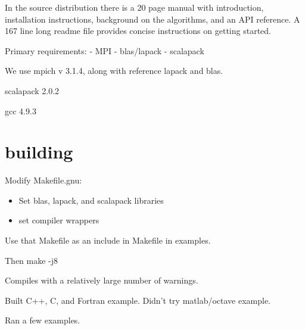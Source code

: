\documentclass{acmsmall}
\begin{document}
In the source distribution there is a 20 page manual with
introduction, installation instructions, background on the
algorithms, and an API reference.  A 167 line long readme file
provides concise instructions on getting started.

Primary requirements:
- MPI
- blas/lapack
- scalapack

We use mpich v 3.1.4, along with reference lapack and blas.

scalapack 2.0.2

gcc 4.9.3


\section{building}

Modify Makefile.gnu:
\begin{itemize}
\item Set blas, lapack, and scalapack libraries
\item set compiler wrappers
\end{itemize}

Use that Makefile as an include in Makefile in examples.

Then make -j8


Compiles with a relatively large number of warnings.

Built C++, C, and Fortran example.  Didn't try matlab/octave example.

Ran a few examples.
\end{document}
